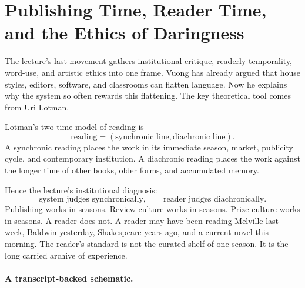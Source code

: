 \section{Publishing Time, Reader Time, and the Ethics of Daringness}

The lecture's last movement gathers institutional critique, readerly temporality, word-use, and artistic ethics into one frame. Vuong has already argued that house styles, editors, software, and classrooms can flatten language. Now he explains why the system so often rewards this flattening. The key theoretical tool comes from Uri Lotman.

\begin{definition}
Lotman's two-time model of reading is
\begin{equation}
\text{reading} = (\text{synchronic line},\text{diachronic line}).
\end{equation}
A synchronic reading places the work in its immediate season, market, publicity cycle, and contemporary institution. A diachronic reading places the work against the longer time of other books, older forms, and accumulated memory.
\end{definition}

Hence the lecture's institutional diagnosis:
\begin{equation}
\text{system judges synchronically}, \qquad \text{reader judges diachronically}.
\end{equation}
Publishing works in seasons. Review culture works in seasons. Prize culture works in seasons. A reader does not. A reader may have been reading Melville last week, Baldwin yesterday, Shakespeare years ago, and a current novel this morning. The reader's standard is not the curated shelf of one season. It is the long carried archive of experience.

\paragraph{A transcript-backed schematic.}
\begin{figure}
\begin{center}
\end{center}
\end{figure}

